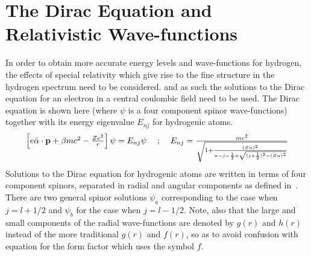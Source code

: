 \section{The Dirac Equation and Relativistic Wave-functions}
    In order to obtain more accurate energy levels and wave-functions for
    hydrogen, the effects of special relativity which give rise to the fine
    structure in the hydrogen spectrum need to be considered. and as such
    the solutions to the Dirac equation for an electron in a central coulombic
    field need to be used.
    The Dirac equation is shown here (where $\psi$ is a four component spinor
    wave-functions) together with its energy eigenvalue $E_{nj}$
    for hydrogenic atoms.
    \begin{equation} \label{eq:dirac-equation}
    \begin{array}{lcr}
        \left[
            e \bar{\alpha} \cdot \mathbf{p} + \beta mc^2 - \frac{Ze^2}{r}
        \right] \psi = E_{nj} \psi
    &
    \; ; \;
    &
    E_{nj} = \frac{mc^2}{
                \sqrt{
                    1 + \frac{(Z\alpha)^2}{n-j-\frac{1}{2} +
                    \sqrt{(j+\frac{1}{2})^2 - (Z\alpha)^2} }
                }
             }
    \end{array}
    \end{equation}
    Solutions to the Dirac equation for hydrogenic atoms are written in terms of
    four component spinors, separated in radial and angular components as
    defined in~\cite{Bethe-Salpeter}. 
    There are two general spinor solutions $\psi_a$ corresponding to the case
    when $j=l+1/2$ and $\psi_b$ for the case when $j=l-1/2$.
    Note, also that the large and small components of the radial wave-functions are 
    denoted by $g(r)$ and $h(r)$ instead of the more traditional $g(r)$ and $f(r)$, 
    so as to avoid confusion with equation for the form factor which uses the symbol $f$.
